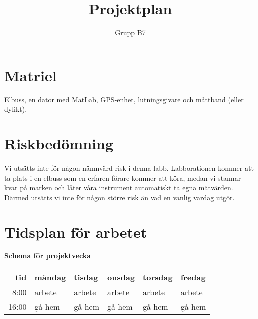 \documentclass[]{article}
\title{Projektplan}
\author{Grupp B7}
\begin{document}
\maketitle



\section{Matriel}
Elbuss, en dator med MatLab, GPS-enhet, lutningsgivare och
måttband (eller dylikt).



\section{Riskbedömning}
Vi utsätts inte för någon nämnvärd risk i denna labb.
Labborationen kommer att ta plats i en elbuss som en erfaren förare kommer att köra,
medan vi stannar kvar på marken och låter våra instrument automatiskt ta egna mätvärden.
Därmed utsätts vi inte för någon större risk än vad en vanlig vardag utgör.

\section{Tidsplan för arbetet}
\begin{center}
	{\textbf{Schema för projektvecka}}
\begin{tabular}{r | l l l l l }
	tid & måndag & tisdag & onsdag & torsdag & fredag \\ \hline
	8:00 & arbete & arbete & arbete & arbete & arbete \\
	16:00 & gå hem & gå hem & gå hem & gå hem & gå hem \\ \hline

\end{tabular}
\end{center}

\clearpage
\printbibliography
\end{document}
